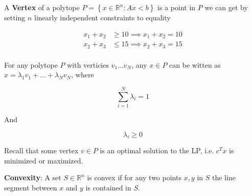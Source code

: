 \documentclass[../notes.tex]{subfiles}
\begin{document}
\begin{definition}
    A \textbf{Vertex} of a polytope $ P = \left\{ x \in \mathbb{R}^n : Ax < b \right\}  $  is a point in $ P $ we  can get by setting $ n $ linearly independent constraints to equality

    \begin{equation}
        \begin{split}
            x_1 + x_2 &\ge 10 \implies x_1 + x_2 = 10  \\
             x_2 + x_3 &\le 15 \implies x_2 + x_3 = 15 \\
        \end{split}
    \end{equation}

\end{definition}

\begin{theorem}
    For any polytope $ P $ with verticies $ v_1 \ldots v_N $, any $ x \in P $ can be witten as $ x = \lambda_1 v_1 + \ldots + \lambda_N v_N $, where

    \begin{equation}
        \sum_{i=1}^N \lambda_i = 1
    \end{equation}

    And

    \begin{equation}
        \lambda_i \ge 0
    \end{equation}

\end{theorem}

Recall that some vertex $ v \in P $ is an optimal solution to the LP, i.e. $ c^Tx$  is minimized or maximized.



\begin{definition}
    \textbf{Convexity}: A set $ S \in \mathbb{R}^n $ is convex if for any two points $ x, y $ in $ S $ the line segment between $ x $ and $ y $ is contained in $ S $.
\end{definition}
\end{document}
